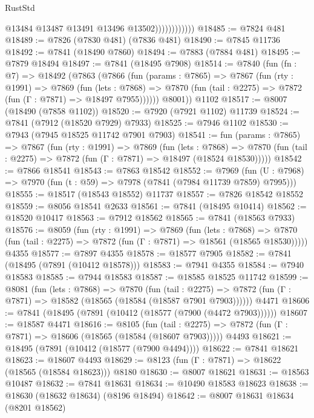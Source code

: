 \begin{lexlean}{RustStd}
\begin{coremodule}
                            @13484
                            @13487
                            @13491
                            @13496
                            @13502))))))))))))
@18485 := @7824 @481
@18489 := @7826 (@7830 @481) (@7836 @481)
@18490 := @7845 @11736
@18492 := @7841 (@18490 @7860)
@18494 := @7883 (@7884 @481)
@18495 := @7879 @18494
@18497 := @7841 (@18495 @7908)
@18514 := @7840
    (fun (fn : @7) =>
    @18492
      (@7863
        (@7866
          (fun (params : @7865) =>
          @7867
            (fun (rty : @1991) =>
            @7869
              (fun (lets : @7868) =>
              @7870 (fun (tail : @2275) => @7872 (fun (Γ : @7871) => @18497 @7955))))))
        @8001))
    @1102
@18517 := @8007 (@18490 (@7858 @1102))
@18520 := @7920 (@7921 @1102) @11739
@18524 := @7841 (@7912 (@18520 @7929) @7933)
@18525 := @7946 @1102
@18530 := @7943 (@7945 @18525 @11742 @7901 @7903)
@18541 := fun (params : @7865) =>
  @7867
    (fun (rty : @1991) =>
    @7869
      (fun (lets : @7868) =>
      @7870 (fun (tail : @2275) => @7872 (fun (Γ : @7871) => @18497 (@18524 @18530)))))
@18542 := @7866 @18541
@18543 := @7863 @18542
@18552 := @7969
    (fun (U : @7968) => @7970 (fun (t : @59) => @7978 (@7841 (@7984 @11739 @7859) @7995)))
@18555 := @18517 (@18543 @18552) @11737
@18557 := @7826 @18542 @18552
@18559 := @8056 @18541 @2633
@18561 := @7841 (@18495 @10414)
@18562 := @18520 @10417
@18563 := @7912 @18562
@18565 := @7841 (@18563 @7933)
@18576 := @8059
    (fun (rty : @1991) =>
    @7869
      (fun (lets : @7868) =>
      @7870 (fun (tail : @2275) => @7872 (fun (Γ : @7871) => @18561 (@18565 @18530)))))
    @4355
@18577 := @7897 @4355
@18578 := @18577 @7905
@18582 := @7841 (@18495 (@7891 (@10412 @18578)))
@18583 := @7941 @4355
@18584 := @7940 @18583
@18585 := @7944 @18583
@18587 := @18585 @18525 @11742
@18599 := @8081
    (fun (lets : @7868) =>
    @7870
      (fun (tail : @2275) =>
      @7872 (fun (Γ : @7871) => @18582 (@18565 (@18584 (@18587 @7901 @7903))))))
    @4471
@18606 := @7841 (@18495 (@7891 (@10412 (@18577 (@7900 (@4472 @7903))))))
@18607 := @18587 @4471
@18616 := @8105
    (fun (tail : @2275) => @7872 (fun (Γ : @7871) => @18606 (@18565 (@18584 (@18607 @7903)))))
    @4493
@18621 := @18495 (@7891 (@10412 (@18577 (@7900 @4494))))
@18622 := @7841 @18621
@18623 := @18607 @4493
@18629 := @8123 (fun (Γ : @7871) => @18622 (@18565 (@18584 @18623))) @8180
@18630 := @8007 @18621
@18631 := @18563 @10487
@18632 := @7841 @18631
@18634 := @10490 @18583 @18623
@18638 := @18630 (@18632 @18634) (@8196 @18494)
@18642 := @8007 @18631 @18634 (@8201 @18562)

\end{coremodule}
\end{lexlean}
